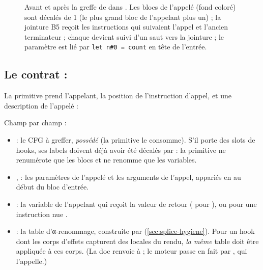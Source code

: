 \begin{figure}[htbp]
\caption{Avant et après la greffe de  dans . Les blocs de l'appelé (fond coloré) sont décalés de 1 (le plus grand bloc de l'appelant plus un) ; la jointure B5 reçoit les instructions qui suivaient l'appel et l'ancien terminateur ; chaque  devient  suivi d'un saut vers la jointure ; le paramètre est lié par \texttt{let n\#0 = count} en tête de l'entrée.}\label{fig:splice-avant-apres}
\end{figure}

\subsection{Le contrat : \texorpdfstring{}{Splice}}

La primitive prend l'appelant, la position de l'instruction d'appel, et une description de l'appelé :


Champ par champ :
\begin{itemize}
  \item {} : le CFG à greffer, \emph{possédé} (la primitive le consomme). S'il porte des slots de hooks, ses labels doivent déjà avoir été décalés par  : la primitive ne renumérote que les blocs et ne renomme que les variables.
  \item {},  : les paramètres de l'appelé et les arguments de l'appel, appariés en  au début du bloc d'entrée.
  \item {} : la variable de l'appelant qui reçoit la valeur de retour ( pour ), ou  pour une instruction nue .
  \item {} : la table d'α-renommage, construite par  (\cref{sec:splice-hygiene}). Pour un hook dont les corps d'effets capturent des locales du rendu, \emph{la même} table doit être appliquée à ces corps. (La doc renvoie à  ; le moteur passe en fait par , qui l'appelle.)
\end{itemize}

